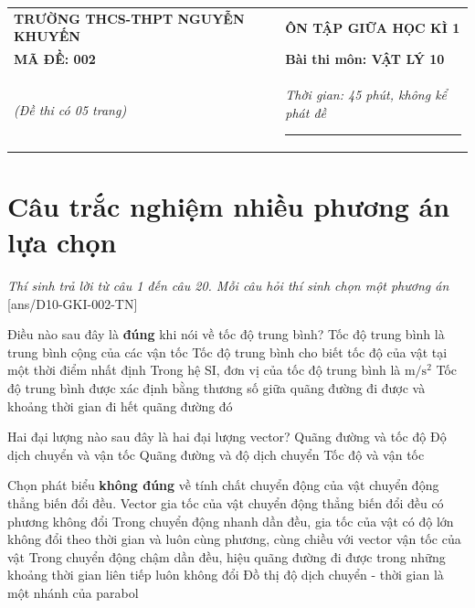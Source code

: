 \begin{center}
	\begin{tabular}{M{10cm}M{8cm}}
		\textbf{TRƯỜNG THCS-THPT NGUYỄN KHUYẾN}& \textbf{ÔN TẬP GIỮA HỌC KÌ 1}\\
		\textbf{MÃ ĐỀ: 002}& \textbf{Bài thi môn: VẬT LÝ 10}\\
		\textit{(Đề thi có 05 trang)}& \textit{Thời gian: 45 phút, không kể phát đề}
		
		\noindent\rule{4cm}{0.8pt} \\
	\end{tabular}
\end{center}
\setcounter{section}{0}
\section{Câu trắc nghiệm nhiều phương án lựa chọn}
\textit{Thí sinh trả lời từ câu 1 đến câu 20. Mỗi câu hỏi thí sinh chọn một phương án}
\setcounter{ex}{0}
[ans/D10-GKI-002-TN]
\begin{ex}
	Điều nào sau đây là \textbf{đúng} khi nói về tốc độ trung bình?
	\choice
	{Tốc độ trung bình là trung bình cộng của các vận tốc}
	{Tốc độ trung bình cho biết tốc độ của vật tại một thời điểm nhất định}
	{Trong hệ SI, đơn vị của tốc độ trung bình là $\si{\meter/\second^2}$}
	{\True Tốc độ trung bình được xác định bằng thương số giữa quãng đường đi được và khoảng thời gian đi hết quãng đường đó}
	\loigiai{}
\end{ex}
\begin{ex}
	Hai đại lượng nào sau đây là hai đại lượng vector?
	\choice
	{Quãng đường và tốc độ}
	{\True Độ dịch chuyển và vận tốc}
	{Quãng đường và độ dịch chuyển}
	{Tốc độ và vận tốc}
	\loigiai{}
\end{ex}
\begin{ex}
	Chọn phát biểu \textbf{không đúng} về tính chất chuyển động của vật chuyển động thẳng biến đổi đều.
	\choice
	{Vector gia tốc của vật chuyển động thẳng biến đổi đều có phương không đổi}
	{Trong chuyển động nhanh dần đều, gia tốc của vật có độ lớn không đổi theo thời gian và luôn cùng phương, cùng chiều với vector vận tốc của vật}
	{\True Trong chuyển động chậm dần đều, hiệu quãng đường đi được trong những khoảng thời gian liên tiếp luôn không đổi}
	{Đồ thị độ dịch chuyển - thời gian là một nhánh của parabol}
	\loigiai{}
\end{ex}
